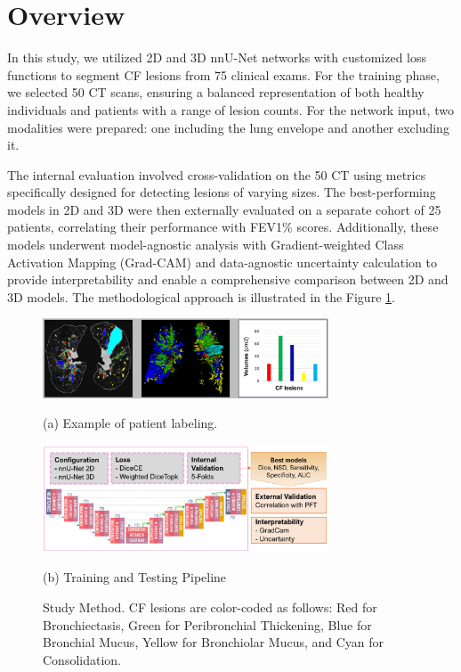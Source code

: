 \documentclass{article}
\begin{document}
\section{Overview}
\label{sec:met}

In this study, we utilized 2D and 3D nnU-Net networks with customized loss functions to segment CF lesions from 75 clinical exams. For the training phase, we selected 50 CT scans, ensuring a balanced representation of both healthy individuals and patients with a range of lesion counts. For the network input, two modalities were prepared: one including the lung envelope and another excluding it.

The internal evaluation involved cross-validation on the 50 CT using metrics specifically designed for detecting lesions of varying sizes. The best-performing models in 2D and 3D were then externally evaluated on a separate cohort of 25 patients, correlating their performance with FEV1\% scores. Additionally, these models underwent model-agnostic analysis with Gradient-weighted Class Activation Mapping (Grad-CAM) \cite{R12} and data-agnostic uncertainty calculation to provide interpretability and enable a comprehensive comparison between 2D and 3D models. The methodological approach is illustrated in the Figure \ref{fig:method}.




\begin{figure}[htb]
\begin{minipage}[a]{1.0\linewidth}
  \centering
  \centerline{\includegraphics[width=8.5cm]{images/patient.eps}}
  \centerline{(a) Example of patient labeling.}\medskip
\end{minipage}
\begin{minipage}[b]{1.0\linewidth}
  \centering
  \centerline{\includegraphics[width=8.5cm]{images/method.eps}}
  \centerline{(b) Training and Testing Pipeline}\medskip
\end{minipage}
%
\caption{Study Method. CF lesions are color-coded
as follows: Red for Bronchiectasis, Green for Peribronchial Thickening, Blue for Bronchial Mucus, Yellow for Bronchiolar
Mucus, and Cyan for Consolidation.}
\label{fig:method}
%
\end{figure}
\end{document}
